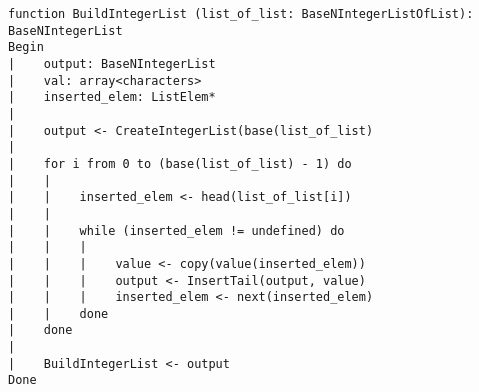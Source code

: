 \begin{lstlisting}[breaklines]
function BuildIntegerList (list_of_list: BaseNIntegerListOfList): BaseNIntegerList
Begin
|    output: BaseNIntegerList
|    val: array<characters>
|    inserted_elem: ListElem*
|
|    output <- CreateIntegerList(base(list_of_list)
|
|    for i from 0 to (base(list_of_list) - 1) do
|    |
|    |    inserted_elem <- head(list_of_list[i])
|    |
|    |    while (inserted_elem != undefined) do
|    |    |
|    |    |    value <- copy(value(inserted_elem))
|    |    |    output <- InsertTail(output, value)
|    |    |    inserted_elem <- next(inserted_elem)
|    |    done
|    done
|
|    BuildIntegerList <- output
Done
\end{lstlisting}
